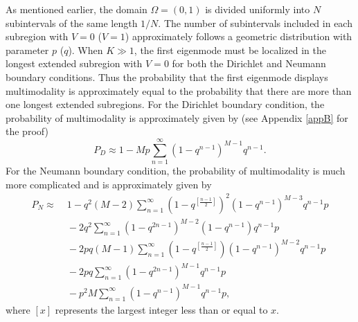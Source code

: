 \documentclass[a4paper,11pt]{article}
\begin{document}
As mentioned earlier, the domain $\Omega = (0, 1)$ is divided uniformly into $N$ subintervals of the same length $1/N$. The number of subintervals included in each subregion with $V = 0$ ($V = 1$) approximately follows a geometric distribution with parameter $p$ ($q$). When $K\gg 1$, the first eigenmode must be localized in the longest extended subregion with $V = 0$ for both the Dirichlet and Neumann boundary conditions. Thus the probability that the first eigenmode displays multimodality is approximately equal to the probability that there are more than one longest extended subregions. For the Dirichlet boundary condition, the probability of multimodality is approximately given by (see Appendix \ref{appB} for the proof)
\begin{equation}\label{multiD}
P_D \approx 1 - M p \sum_{n=1}^{\infty} (1 - q^{n-1})^{M-1} q^{n-1}.
\end{equation}
For the Neumann boundary condition, the probability of multimodality is much more complicated and is approximately given by
\begin{equation}\label{multiN}
\begin{split}
P_N \approx&\; 1 - q^2 (M-2) \sum_{n=1}^{\infty} (1 - q^{[\frac{n-1}{2}]})^2 (1 - q^{n-1})^{M-3} q^{n-1} p \\
&\;- 2 q^2 \sum_{n=1}^{\infty} (1 - q^{2n-1})^{M-2} (1 - q^{n-1}) q^{n-1} p \\
&\;- 2 p q (M-1) \sum_{n=1}^{\infty} (1 - q^{[\frac{n-1}{2}]}) (1 - q^{n-1})^{M-2} q^{n-1} p \\
&\;- 2 p q \sum_{n=1}^{\infty} (1 - q^{2n-1})^{M-1} q^{n-1} p \\
&\;- p^2 M \sum_{n=1}^{\infty} (1 - q^{n-1})^{M-1} q^{n-1} p,
\end{split}
\end{equation}
where $[x]$ represents the largest integer less than or equal to $x$.

\end{document}
